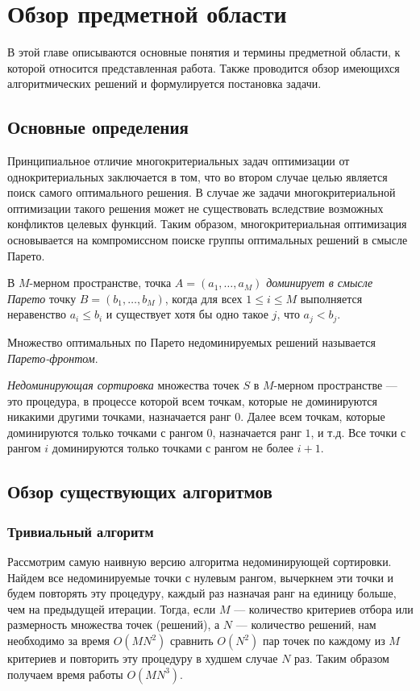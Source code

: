 \chapter{Обзор предметной области}
В этой главе описываются основные понятия и термины предметной области, к которой относится представленная работа. Также проводится обзор имеющихся алгоритмических решений и формулируется постановка задачи.

\section{Основные определения}

Принципиальное отличие многокритериальных задач оптимизации от однокритериальных заключается в том, что во втором случае целью является поиск самого оптимального решения. В случае же задачи многокритериальной оптимизации такого решения может не существовать вследствие возможных конфликтов целевых функций. Таким образом, многокритериальная оптимизация основывается на компромиссном поиске группы оптимальных решений в смысле Парето.
\begin{definition}
    В $M$-мерном пространстве, точка $A = (a_1, \ldots, a_M)$ \textit{доминирует в смысле Парето} точку $B = (b_1, \ldots, b_M)$, когда для всех $1 \leq i \leq M$ выполняется неравенство $a_i \leq b_i$ и существует хотя бы одно такое $j$, что $a_j < b_j$.
\end{definition}
\begin{definition}
    Множество оптимальных по Парето недоминируемых решений называется \textit{Парето-фронтом}.
\end{definition}
\begin{definition}
    \textit{Недоминирующая сортировка} множества точек $S$ в $M$-мерном пространстве --- это процедура, в процессе которой всем точкам, которые не доминируются никакими другими точками, назначается ранг $0$. Далее всем точкам, которые доминируются только точками с рангом $0$, назначается ранг $1$, и т.д. Все точки с рангом $i$ доминируются только точками с рангом не более $i + 1$.
\end{definition}

\section{Обзор существующих алгоритмов}
\subsection{Тривиальный алгоритм}
Рассмотрим самую наивную версию алгоритма недоминирующей сортировки. Найдем все недоминируемые точки с нулевым рангом, вычеркнем эти точки и будем повторять эту процедуру, каждый раз назначая ранг на единицу больше, чем на предыдущей итерации. Тогда, если $M$ --- количество критериев отбора или размерность множества точек (решений), а $N$ --- количество решений, нам необходимо за время $O(MN^2)$ сравнить $O(N^2)$ пар точек по каждому из $M$ критериев и повторить эту процедуру в худшем случае $N$ раз. Таким образом получаем время работы $O(MN^3)$.

